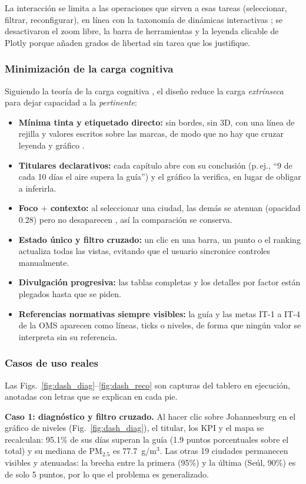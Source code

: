 \documentclass[journal,twocolumn,spanish]{IEEEtran}
\begin{document}
La interacción se limita a las operaciones que sirven a esas tareas (seleccionar, filtrar, reconfigurar), en línea con la taxonomía de dinámicas interactivas \cite{Heer2012}; se desactivaron el zoom libre, la barra de herramientas y la leyenda clicable de Plotly porque añaden grados de libertad sin tarea que los justifique.

\subsubsection*{Minimización de la carga cognitiva}
Siguiendo la teoría de la carga cognitiva \cite{Sweller1988}, el diseño reduce la carga \emph{extrínseca} para dejar capacidad a la \emph{pertinente}:
\begin{itemize}
\item \textbf{Mínima tinta y etiquetado directo:} sin bordes, sin 3D, con una línea de rejilla y valores escritos sobre las marcas, de modo que no hay que cruzar leyenda y gráfico \cite{Tufte2001,Few2013}.
\item \textbf{Titulares declarativos:} cada capítulo abre con su conclusión (p.\,ej., ``9 de cada 10 días el aire supera la guía'') y el gráfico la verifica, en lugar de obligar a inferirla.
\item \textbf{Foco $+$ contexto:} al seleccionar una ciudad, las demás se atenuan (opacidad 0.28) pero no desaparecen \cite{Furnas1986}, así la comparación se conserva.
\item \textbf{Estado único y filtro cruzado:} un clic en una barra, un punto o el ranking actualiza todas las vistas, evitando que el usuario sincronice controles manualmente.
\item \textbf{Divulgación progresiva:} las tablas completas y los detalles por factor están plegados hasta que se piden.
\item \textbf{Referencias normativas siempre visibles:} la guía y las metas IT-1 a IT-4 de la OMS \cite{OMS2021} aparecen como líneas, ticks o niveles, de forma que ningún valor se interpreta sin su referencia.
\end{itemize}

\subsubsection*{Casos de uso reales}
Las Figs.~\ref{fig:dash_diag}--\ref{fig:dash_reco} son capturas del tablero en ejecución, anotadas con letras que se explican en cada pie.

\textbf{Caso 1: diagnóstico y filtro cruzado.} Al hacer clic sobre Johannesburg en el gráfico de niveles (Fig.~\ref{fig:dash_diag}), el titular, los KPI y el mapa se recalculan: 95.1\% de sus días superan la guía (1.9 puntos porcentuales sobre el total) y su mediana de PM$_{2.5}$ es 77.7~\textmu g/m$^3$. Las otras 19 ciudades permanecen visibles y atenuadas: la brecha entre la primera (95\%) y la última (Seúl, 90\%) es de solo 5 puntos, por lo que el problema es generalizado.
\end{document}
